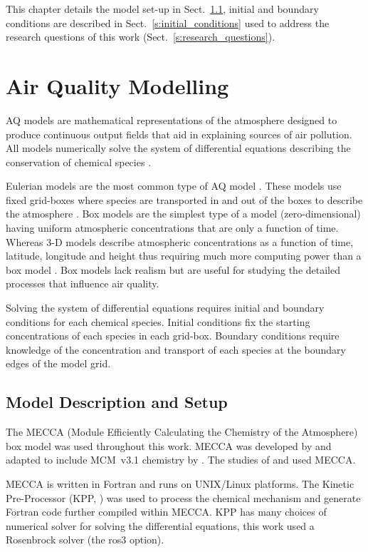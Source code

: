 This chapter details the model set-up in Sect.~\ref{ss:model_setup}, initial and boundary conditions are described in Sect.~\ref{s:initial_conditions} used to address the research questions of this work (Sect.~\ref{s:research_questions}).

\section{Air Quality Modelling} \label{s:modelling}
AQ models are mathematical representations of the atmosphere designed to produce continuous output fields that aid in explaining sources of air pollution.
All models numerically solve the system of differential equations describing the conservation of chemical species \citep{Russell:2000}.

Eulerian models are the most common type of AQ model \citep{Russell:2000}.
These models use fixed grid-boxes where species are transported in and out of the boxes to describe the atmosphere \citep{Seinfeld:2006}. 
Box models are the simplest type of a model (zero-dimensional) having uniform atmospheric concentrations that are only a function of time.
Whereas 3-D models describe atmospheric concentrations as a function of time, latitude, longitude and height thus requiring much more computing power than a box model \citep{Seinfeld:2006}.
Box models lack realism but are useful for studying the detailed processes that influence air quality.

Solving the system of differential equations requires initial and boundary conditions for each chemical species.
Initial conditions fix the starting concentrations of each species in each grid-box.
Boundary conditions require knowledge of the concentration and transport of each species at the boundary edges of the model grid.

\subsection{Model Description and Setup} \label{ss:model_setup}
The MECCA (Module Efficiently Calculating the Chemistry of the Atmosphere) box model was used throughout this work.
MECCA was developed by \citet{Sander:2005} and adapted to include MCM~v3.1 chemistry by \citet{Butler:2011}.
The studies of \citet{Kubistin:2010} and \citet{Lourens:2016} used MECCA.

MECCA is written in Fortran and runs on UNIX/Linux platforms.
The Kinetic Pre-Processor (KPP, \citet{Damian:2002}) was used to process the chemical mechanism and generate Fortran code further compiled within MECCA.
KPP has many choices of numerical solver for solving the differential equations, this work used a Rosenbrock solver (the ros3 option).


